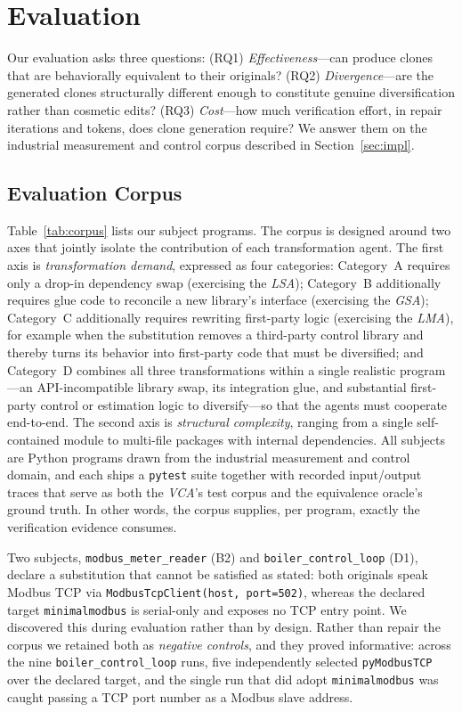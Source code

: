 \section{Evaluation}
\label{sec:results}

Our evaluation asks three questions: (RQ1) \emph{Effectiveness}---can \sys produce clones that are behaviorally equivalent to their originals? (RQ2) \emph{Divergence}---are the generated clones structurally different enough to constitute genuine diversification rather than cosmetic edits? (RQ3) \emph{Cost}---how much verification effort, in repair iterations and tokens, does clone generation require? We answer them on the industrial measurement and control corpus described in Section~\ref{sec:impl}.

\subsection{Evaluation Corpus}

Table~\ref{tab:corpus} lists our subject programs. The corpus is designed around two axes that jointly isolate the contribution of each transformation agent. The first axis is \emph{transformation demand}, expressed as four categories: Category~A requires only a drop-in dependency swap (exercising the \emph{LSA}); Category~B additionally requires glue code to reconcile a new library's interface (exercising the \emph{GSA}); Category~C additionally requires rewriting first-party logic (exercising the \emph{LMA}), for example when the substitution removes a third-party control library and thereby turns its behavior into first-party code that must be diversified; and Category~D combines all three transformations within a single realistic program---an API-incompatible library swap, its integration glue, and substantial first-party control or estimation logic to diversify---so that the agents must cooperate end-to-end. The second axis is \emph{structural complexity}, ranging from a single self-contained module to multi-file packages with internal dependencies. All subjects are Python programs drawn from the industrial measurement and control domain, and each ships a \texttt{pytest} suite together with recorded input/output traces that serve as both the \emph{VCA}'s test corpus and the equivalence oracle's ground truth. In other words, the corpus supplies, per program, exactly the verification evidence \sys consumes.

Two subjects, \texttt{modbus\_meter\_reader} (B2) and \texttt{boiler\_control\_loop} (D1), declare a substitution that cannot be satisfied as stated: both originals speak Modbus TCP via \texttt{ModbusTcpClient(host, port=502)}, whereas the declared target \texttt{minimalmodbus} is serial-only and exposes no TCP entry point. We discovered this during evaluation rather than by design. Rather than repair the corpus we retained both as \emph{negative controls}, and they proved informative: across the nine \texttt{boiler\_control\_loop} runs, five independently selected \texttt{pyModbusTCP} over the declared target, and the single run that did adopt \texttt{minimalmodbus} was caught passing a TCP port number as a Modbus slave address.

